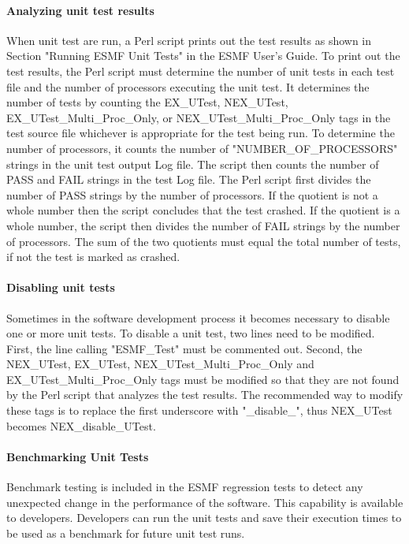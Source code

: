 \paragraph{Analyzing unit test results }
When unit test are run, a Perl script prints out the test results as shown in
Section "Running ESMF Unit Tests" in the ESMF User's Guide. To print out the test results,
the Perl script must determine the number of unit tests in each test file and the number of
processors executing the unit test. It determines the number of tests by counting the
EX\_UTest, NEX\_UTest, EX\_UTest\_Multi\_Proc\_Only, or NEX\_UTest\_Multi\_Proc\_Only 
tags in the test source file whichever is appropriate for the test being run. 
To determine the number of processors, it counts the number of "NUMBER\_OF\_PROCESSORS" strings in the
unit test output Log file. The script then counts the number of PASS and FAIL strings in the
test Log file.
The Perl script first divides the number of PASS strings by the number of processors. If the
quotient is not a whole  number then the script concludes that the test crashed. If the quotient
is a whole number, the script then divides the number of FAIL strings by the number of processors.
The sum of the two quotients must equal the total number of tests, if not the test is marked
as crashed.



\paragraph{Disabling unit tests }
Sometimes in the software development process it becomes necessary to disable one or more unit tests.
To disable a unit test, two lines need to be modified. First, the line calling "ESMF\_Test" must be commented out.
Second, the NEX\_UTest, EX\_UTest, NEX\_UTest\_Multi\_Proc\_Only and EX\_UTest\_Multi\_Proc\_Only tags must be modified
so that they are not found by the Perl script that analyzes the test results.
The recommended way to modify these tags is to replace the first underscore with "\_disable\_", thus NEX\_UTest becomes
NEX\_disable\_UTest. 

\paragraph{Benchmarking Unit Tests}
Benchmark testing is included in the ESMF regression tests to detect any unexpected
change in the performance of the software. This capability is available to developers.
Developers can run the unit tests and save their execution
times to be used as a benchmark for future unit test runs.

